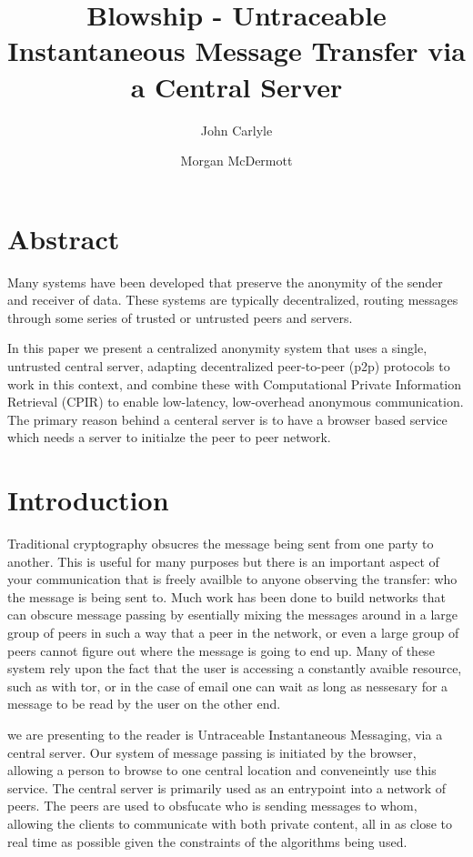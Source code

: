 \documentclass[twocolumn]{paper}
\title{Blowship - Untraceable Instantaneous Message Transfer via a Central Server}
\author[*]{John Carlyle}
\author[**]{Morgan McDermott}
\affil[*]{University of angry bees}
\affil[**]{University of flightless dragons}
\begin{document}
\maketitle

\section*{Abstract} 
Many systems have been developed that preserve the anonymity of the sender and receiver of data. These systems are typically decentralized, routing messages through some series of trusted or untrusted peers and servers. 

In this paper we present a centralized anonymity system that uses a single, untrusted central server, adapting decentralized peer-to-peer (p2p) protocols to work in this context, and combine these with Computational Private Information Retrieval (CPIR) to enable low-latency, low-overhead anonymous communication. The primary reason behind a centeral server is to have a browser based service which needs a server to initialze the peer to peer network.

\section{Introduction}

Traditional cryptography obsucres the message being sent from one party to another. This is useful for many purposes but there is an important aspect of your communication that is freely availble to anyone observing the transfer: who the message is being sent to. Much work has been done to build networks that can obscure message passing by esentially mixing the messages around in a large group of peers in such a way that a peer in the network, or even a large group of peers cannot figure out where the message is going to end up. Many of these system rely upon the fact that the user is accessing a constantly avaible resource, such as with tor\cite{tor-design}, or in the case of email one can wait as long as nessesary for a message to be read by the user on the other end.

we are presenting to the reader is Untraceable Instantaneous Messaging, via a central server. Our system of message passing is initiated by the browser, allowing a person to browse to one central location and conveneintly use this service. The central server is primarily used as an entrypoint into a network of peers. The peers are used to obsfucate who is sending messages to whom, allowing the clients to communicate with both private content, all in as close to real time as possible given the constraints of the algorithms being used.
\end{document}

